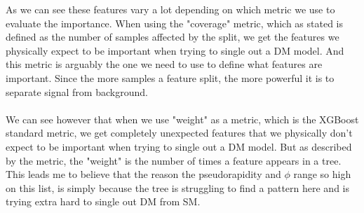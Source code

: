 \documentclass[14pt, a4paper]{book}
\begin{document}
\newpage\noindent As we can see these features vary a lot depending on which metric we use to evaluate the importance. 
When using the "coverage" metric, which as stated is defined as the number of samples affected by the split, we get the features we physically expect to be important when trying to single out a DM model.
And this metric is arguably the one we need to use to define what features are important. Since the more samples a feature split, the more powerful it is to separate signal from background.\\
\\We can see however that when we use "weight" as a metric, which is the XGBoost standard metric, we get completely unexpected features that we physically don't expect to be important when trying to single out a DM model.
But as described by the metric, the "weight" is the number of times a feature appears in a tree. This leads me to believe that the reason the pseudorapidity and $\phi$ range so high on this list, 
is simply because the tree is struggling to find a pattern here and is trying extra hard to single out DM from SM.


\clearpage
\graphicspath{{../../figures/}}
\end{document}
